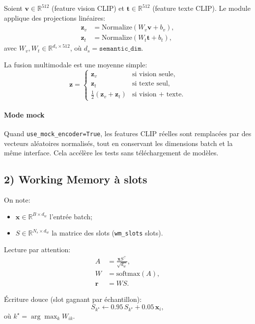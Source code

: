 \documentclass[12pt,a4paper]{article}
\begin{document}
Soient $\mathbf{v}\in\mathbb{R}^{512}$ (feature vision CLIP) et $\mathbf{t}\in\mathbb{R}^{512}$ (feature texte CLIP).  
Le module applique des projections linéaires:
\begin{align}
\mathbf{z}_v &= \mathrm{Normalize}(W_v\mathbf{v} + b_v), \\
\mathbf{z}_t &= \mathrm{Normalize}(W_t\mathbf{t} + b_t),
\end{align}
avec $W_v, W_t \in \mathbb{R}^{d_s \times 512}$, où $d_s=\texttt{semantic\_dim}$.

La fusion multimodale est une moyenne simple:
\begin{equation}
\mathbf{z} =
\begin{cases}
\mathbf{z}_v & \text{si vision seule,}\\
\mathbf{z}_t & \text{si texte seul,}\\
\frac{1}{2}(\mathbf{z}_v+\mathbf{z}_t) & \text{si vision + texte.}
\end{cases}
\end{equation}

\paragraph{Mode mock}
Quand \texttt{use\_mock\_encoder=True}, les features CLIP réelles sont remplacées par des vecteurs aléatoires normalisés, tout en conservant les dimensions batch et la même interface. Cela accélère les tests sans téléchargement de modèles.

\subsection{2) Working Memory à slots}

On note:
\begin{itemize}
    \item $\mathbf{x}\in\mathbb{R}^{B\times d_w}$ l'entrée batch;
    \item $S\in\mathbb{R}^{N_s\times d_w}$ la matrice des slots (\texttt{wm\_slots} slots).
\end{itemize}

Lecture par attention:
\begin{align}
A &= \frac{\mathbf{x}S^\top}{\sqrt{d_w}},\\
W &= \mathrm{softmax}(A),\\
\mathbf{r} &= WS.
\end{align}

Écriture douce (slot gagnant par échantillon):
\begin{equation}
S_{k^\star} \leftarrow 0.95\,S_{k^\star} + 0.05\,\mathbf{x}_i,
\end{equation}
où $k^\star=\arg\max_k W_{ik}$.
\end{document}
